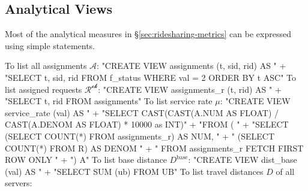 \subsection{Analytical Views}
Most of the analytical measures in \S\ref{sec:ridesharing-metrics} can
be expressed using simple statements.

To list all assignments $\mathcal{A}$:
\nwenddocs{}\endmoddef{}
"CREATE VIEW assignments (t, sid, rid) AS "
  + "SELECT t, sid, rid FROM f_status WHERE val = 2 ORDER BY t ASC"
\nwendcode{}\nwdocspar
To list assigned requests $\mathcal{R^\textrm{ok}}$:
\nwenddocs{}\endmoddef{}
"CREATE VIEW assignments_r (t, rid) AS "
  + "SELECT t, rid FROM assignments"
\nwendcode{}\nwdocspar
To list service rate $\mu$:
\nwenddocs{}\endmoddef{}
"CREATE VIEW service_rate (val) AS "
  + "SELECT CAST(CAST(A.NUM AS FLOAT) / CAST(A.DENOM AS FLOAT) * 10000 as INT)"
  + "FROM ( "
  + "SELECT (SELECT COUNT(*) FROM assignments_r) AS NUM, "
  + "       (SELECT COUNT(*) FROM R) AS DENOM "
  + "       FROM assignments_r FETCH FIRST ROW ONLY "
  + ") A"
\nwendcode{}\nwdocspar
To list base distance $D^\textrm{base}$:
\nwenddocs{}\endmoddef{}
"CREATE VIEW dist_base (val) AS "
  + "SELECT SUM (ub) FROM UB"
\nwendcode{}\nwdocspar
To list travel distances $D$ of all servers:
\nwenddocs{}\endmoddef{}
